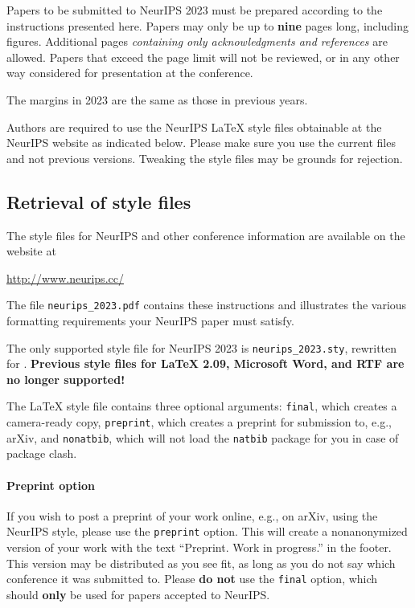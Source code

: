 \documentclass{article}
\begin{document}
Papers to be submitted to NeurIPS 2023 must be prepared according to the
instructions presented here. Papers may only be up to {\bf nine} pages long,
including figures. Additional pages \emph{containing only acknowledgments and
references} are allowed. Papers that exceed the page limit will not be
reviewed, or in any other way considered for presentation at the conference.


The margins in 2023 are the same as those in previous years.


Authors are required to use the NeurIPS \LaTeX{} style files obtainable at the
NeurIPS website as indicated below. Please make sure you use the current files
and not previous versions. Tweaking the style files may be grounds for
rejection.


\subsection{Retrieval of style files}


The style files for NeurIPS and other conference information are available on
the website at
\begin{center}
  \url{http://www.neurips.cc/}
\end{center}
The file \verb+neurips_2023.pdf+ contains these instructions and illustrates the
various formatting requirements your NeurIPS paper must satisfy.


The only supported style file for NeurIPS 2023 is \verb+neurips_2023.sty+,
rewritten for \LaTeXe{}.  \textbf{Previous style files for \LaTeX{} 2.09,
  Microsoft Word, and RTF are no longer supported!}


The \LaTeX{} style file contains three optional arguments: \verb+final+, which
creates a camera-ready copy, \verb+preprint+, which creates a preprint for
submission to, e.g., arXiv, and \verb+nonatbib+, which will not load the
\verb+natbib+ package for you in case of package clash.


\paragraph{Preprint option}
If you wish to post a preprint of your work online, e.g., on arXiv, using the
NeurIPS style, please use the \verb+preprint+ option. This will create a
nonanonymized version of your work with the text ``Preprint. Work in progress.''
in the footer. This version may be distributed as you see fit, as long as you do not say which conference it was submitted to. Please \textbf{do
  not} use the \verb+final+ option, which should \textbf{only} be used for
papers accepted to NeurIPS. 
\end{document}
